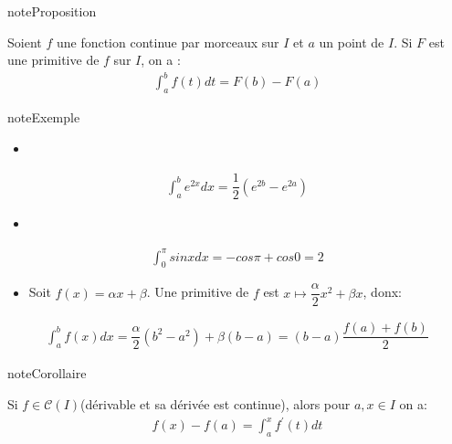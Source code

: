 \documentclass[letterpaper,10pt,french]{sphinxmanual}
\begin{document}
\begin{sphinxadmonition}{note}{Proposition}

\sphinxAtStartPar
Soient \(f\) une fonction continue par morceaux sur \(I\) et \(a\) un point de \(I\). Si \(F\) est une primitive de \(f\) sur \(I\), on a :
\begin{equation*}
\begin{split}
\int_a^b f(t) dt = F(b) - F(a)
\end{split}
\end{equation*}\end{sphinxadmonition}

\begin{sphinxadmonition}{note}{Exemple}
\begin{itemize}
\item {} 
\end{itemize}
\begin{equation*}
\begin{split}
\int_a^b e^{2x} dx = \dfrac{1}{2} (e^{2b} - e^{2a})
\end{split}
\end{equation*}\begin{itemize}
\item {} 
\end{itemize}
\begin{equation*}
\begin{split}
\int_0^\pi sin x dx = - cos \pi + cos 0 = 2
\end{split}
\end{equation*}\begin{itemize}
\item {} 
\sphinxAtStartPar
Soit \(f(x)=\alpha x + \beta\). Une primitive de \(f\) est \(x \mapsto \dfrac{\alpha}{2}x^2 + \beta x\), donx:

\end{itemize}
\begin{equation*}
\begin{split}
\int_a^bf(x)dx = \dfrac{\alpha}{2}(b^2 - a^2) + \beta (b-a) = (b-a)\dfrac{f(a)+ f(b)}{2}
\end{split}
\end{equation*}\end{sphinxadmonition}

\begin{sphinxadmonition}{note}{Corollaire}

\sphinxAtStartPar
Si \(f \in \mathcal C (I)\)(dérivable et sa dérivée est continue), alors pour \(a, x \in I\) on a:
\begin{equation*}
\begin{split}
f(x) - f(a) = \int_a^x f^{'}(t)dt
\end{split}
\end{equation*}\end{sphinxadmonition}
\end{document}
